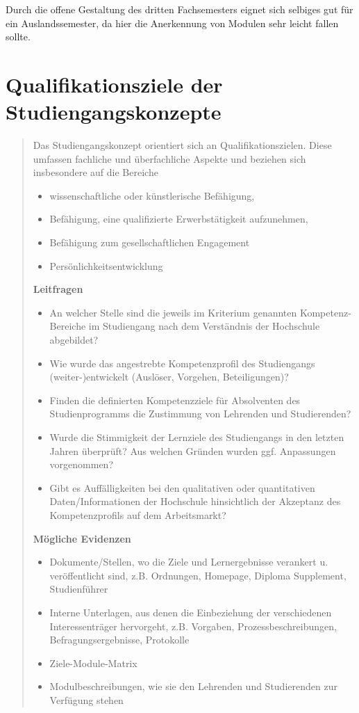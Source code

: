 Durch die offene Gestaltung des dritten Fachsemesters eignet sich
selbiges gut für ein Auslandssemester, da hier die Anerkennung von
Modulen sehr leicht fallen sollte.

\chapter{Qualifikationsziele der
Studiengangskonzepte}\label{qualifikationsziele-der-studiengangskonzepte}

\begin{quote}
Das Studiengangskonzept orientiert sich an Qualifikationszielen. Diese
umfassen fachliche und überfachliche Aspekte und beziehen sich
insbesondere auf die Bereiche

\begin{itemize}
\item
  wissenschaftliche oder künstlerische Befähigung,
\item
  Befähigung, eine qualifizierte Erwerbstätigkeit aufzunehmen,
\item
  Befähigung zum gesellschaftlichen Engagement
\item
  Persönlichkeitsentwicklung
\end{itemize}

\textbf{Leitfragen}

\begin{itemize}
\item
  An welcher Stelle sind die jeweils im Kriterium genannten
  Kompetenz-Bereiche im Studiengang nach dem Verständnis der Hochschule
  abgebildet?
\item
  Wie wurde das angestrebte Kompetenzprofil des Studiengangs
  (weiter-)entwickelt (Auslöser, Vorgehen, Beteiligungen)?
\item
  Finden die definierten Kompetenzziele für Absolventen des
  Studienprogramms die Zustimmung von Lehrenden und Studierenden?
\item
  Wurde die Stimmigkeit der Lernziele des Studiengangs in den letzten
  Jahren überprüft? Aus welchen Gründen wurden ggf. Anpassungen
  vorgenommen?
\item
  Gibt es Auffälligkeiten bei den qualitativen oder quantitativen
  Daten/Informationen der Hochschule hinsichtlich der Akzeptanz des
  Kompetenzprofils auf dem Arbeitsmarkt?
\end{itemize}

\textbf{Mögliche Evidenzen}

\begin{itemize}
\item
  Dokumente/Stellen, wo die Ziele und Lernergebnisse verankert u.
  veröffentlicht sind, z.B. Ordnungen, Homepage, Diploma Supplement,
  Studienführer
\item
  Interne Unterlagen, aus denen die Einbeziehung der verschiedenen
  Interessenträger hervorgeht, z.B. Vorgaben, Prozessbeschreibungen,
  Befragungsergebnisse, Protokolle
\item
  Ziele-Module-Matrix
\item
  Modulbeschreibungen, wie sie den Lehrenden und Studierenden zur
  Verfügung stehen
\end{itemize}
\end{quote}

